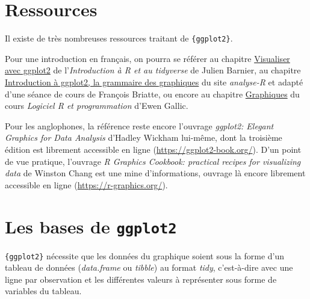 \documentclass[
  letterpaper,
  DIV=11,
  numbers=noendperiod,
  oneside]{scrreprt}
\begin{document}
\hypertarget{ressources}{%
\section{Ressources}\label{ressources}}

Il existe de très nombreuses ressources traitant de
\texttt{\{ggplot2\}}.

Pour une introduction en français, on pourra se référer au chapitre
\href{https://juba.github.io/tidyverse/08-ggplot2.html}{Visualiser avec
ggplot2} de l'\emph{Introduction à R et au tidyverse} de Julien Barnier,
au chapitre
\href{https://larmarange.github.io/analyse-R/intro-ggplot2.html}{Introduction
à ggplot2, la grammaire des graphiques} du site \emph{analyse-R} et
adapté d'une séance de cours de François Briatte, ou encore au chapitre
\href{http://egallic.fr/Enseignement/R/m1_stat_eco_logiciel_R.pdf}{Graphiques}
du cours \emph{Logiciel R et programmation} d'Ewen Gallic.

Pour les anglophones, la référence reste encore l'ouvrage \emph{ggplot2:
Elegant Graphics for Data Analysis} d'Hadley Wickham lui-même, dont la
troisième édition est librement accessible en ligne
(\url{https://ggplot2-book.org/}). D'un point de vue pratique, l'ouvrage
\emph{R Graphics Cookbook: practical recipes for visualizing data} de
Winston Chang est une mine d'informations, ouvrage là encore librement
accessible en ligne (\url{https://r-graphics.org/}).

\hypertarget{les-bases-de-ggplot2}{%
\section{\texorpdfstring{Les bases de
\texttt{ggplot2}}{Les bases de ggplot2}}\label{les-bases-de-ggplot2}}

\texttt{\{ggplot2\}} nécessite que les données du graphique soient sous
la forme d'un tableau de données (\emph{data.frame} ou \emph{tibble}) au
format \emph{tidy}, c'est-à-dire avec une ligne par observation et les
différentes valeurs à représenter sous forme de variables du tableau.
\end{document}
